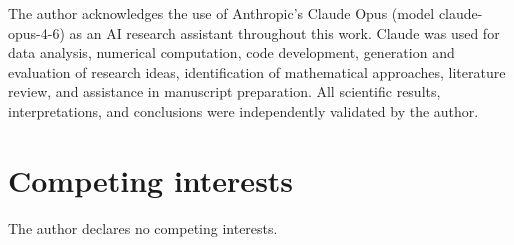 \documentclass[10pt]{article}
\begin{document}
The author acknowledges the use of Anthropic's Claude Opus
(model claude-opus-4-6) as an AI research assistant throughout this work.
Claude was used for data analysis, numerical computation, code development,
generation and evaluation of research ideas, identification of mathematical
approaches, literature review, and assistance in manuscript preparation.
All scientific results, interpretations, and conclusions were independently
validated by the author.

\section*{Competing interests}
The author declares no competing interests.




\end{document}
